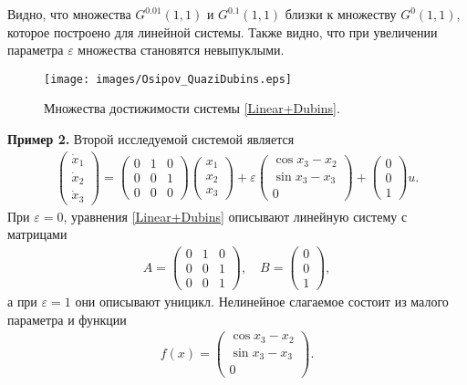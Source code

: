 \documentclass[../main.tex]{subfiles}
\begin{document}
 Видно, что множества $G^{0.01}(1,1) $ и $G^{0.1}(1,1) $ близки к множеству $G^{0}(1,1) $, которое построено для линейной системы. 
 Также видно, что при увеличении параметра $\varepsilon$ множества становятся невыпуклыми. 
 
\begin{figure}[ht]
 \centerline{
 \texttt{[image: images/Osipov\_QuaziDubins.eps]}}
 \caption{Множества достижимости системы \eqref{Linear+Dubins}.}
 \label{fig:LinearDubins}
\end{figure}
\textbf{Пример 2.}
 Второй исследуемой системой является
 \begin{gather}\label{Linear+Dubins}
 \begin{pmatrix} 
 \dot{x}_1 \\
 \dot{x}_2 \\ 
 \dot{x}_3 \end{pmatrix} = 
 \begin{pmatrix}
 0 & 1 & 0 \\
 0 & 0 & 1 \\
 0 & 0 & 0
 \end{pmatrix}
 \begin{pmatrix} 
 x_1 \\
 x_2 \\ 
 x_3 \end{pmatrix} + 
 \varepsilon
 \begin{pmatrix}
 \cos x_3 - x_2\\
 \sin x_3 - x_3 \\
 0
 \end{pmatrix} + 
 \begin{pmatrix}
 0 \\ 0 \\ 1
 \end{pmatrix} u.
 \end{gather}
 При $\varepsilon = 0$, уравнения \eqref{Linear+Dubins} описывают линейную систему с матрицами 
 \begin{gather*}
 A = \begin{pmatrix} 0 & 1 & 0\\
 0 & 0 & 1\\ 
 0 & 0 & 1 
 \end{pmatrix}, \quad B = \begin{pmatrix}
 0\\
 0\\
 1
 \end{pmatrix},
 \end{gather*}
 а при $\varepsilon = 1$ они описывают уницикл. 
 Нелинейное слагаемое состоит из малого параметра и функции
 \begin{gather*}
 f(x) = \begin{pmatrix}
 \cos x_3 - x_2\\
 \sin x_3 - x_3 \\
 0
 \end{pmatrix}.
 \end{gather*}
 
\end{document}
